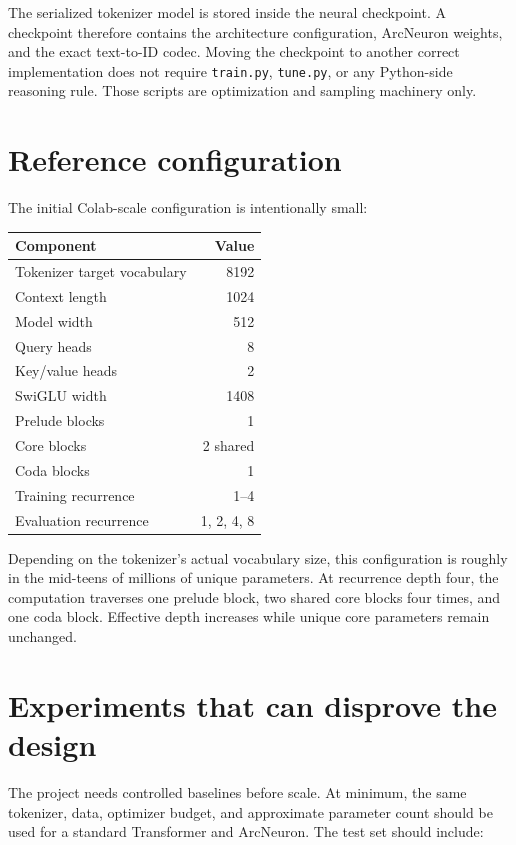 \documentclass[10pt]{article}
\begin{document}
The serialized tokenizer model is stored inside the neural checkpoint. A checkpoint therefore contains the architecture configuration, ArcNeuron weights, and the exact text-to-ID codec. Moving the checkpoint to another correct implementation does not require \texttt{train.py}, \texttt{tune.py}, or any Python-side reasoning rule. Those scripts are optimization and sampling machinery only.

\section{Reference configuration}

The initial Colab-scale configuration is intentionally small:

\begin{center}
\begin{tabular}{lr}
\toprule
Component & Value \\
\midrule
Tokenizer target vocabulary & 8192 \\
Context length & 1024 \\
Model width & 512 \\
Query heads & 8 \\
Key/value heads & 2 \\
SwiGLU width & 1408 \\
Prelude blocks & 1 \\
Core blocks & 2 shared \\
Coda blocks & 1 \\
Training recurrence & 1--4 \\
Evaluation recurrence & 1, 2, 4, 8 \\
\bottomrule
\end{tabular}
\end{center}

Depending on the tokenizer's actual vocabulary size, this configuration is roughly in the mid-teens of millions of unique parameters. At recurrence depth four, the computation traverses one prelude block, two shared core blocks four times, and one coda block. Effective depth increases while unique core parameters remain unchanged.

\section{Experiments that can disprove the design}

The project needs controlled baselines before scale. At minimum, the same tokenizer, data, optimizer budget, and approximate parameter count should be used for a standard Transformer and ArcNeuron. The test set should include:
\end{document}
